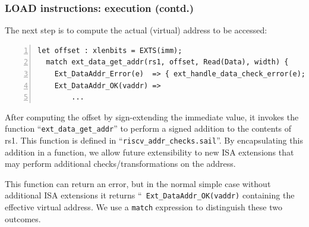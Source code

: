 \documentclass[aspectratio=169]{beamer}
\newcommand{\slidefont}{\scriptsize}
\newcommand{\cf}{\scriptsize\tt}
\begin{document}
\begin{frame}[fragile]
  \frametitle{LOAD instructions: execution (contd.)}

  \slidefont

  The next step is to compute the actual (virtual) address to be accessed:

  \begin{Verbatim}[frame=single, numbers=left, label = File riscv\_insts\_base.sail]
  let offset : xlenbits = EXTS(imm);
  match ext_data_get_addr(rs1, offset, Read(Data), width) {
    Ext_DataAddr_Error(e)  => { ext_handle_data_check_error(e); RETIRE_FAIL },
    Ext_DataAddr_OK(vaddr) =>
        ...
  \end{Verbatim}

  \begin{minipage}{\textwidth}
    After computing the offset by sign-extending the immediate value,
    it invokes the function ``{\cf ext\_data\_get\_addr}'' to perform
    a signed addition to the contents of rs1.  This function is
    defined in ``{\cf riscv\_addr\_checks.sail}''.  By encapsulating
    this addition in a function, we allow future extensibility to new
    ISA extensions that may perform additional checks/transformations
    on the address.

    \vspace{1ex}

    This function can return an error, but in the normal simple case
    without additional ISA extensions it returns ``{\cf
      Ext\_DataAddr\_OK(vaddr)} containing the effective virtual
    address.  We use a {\cf match} expression to distinguish these two
    outcomes.
  \end{minipage}


\end{frame}

\end{document}
